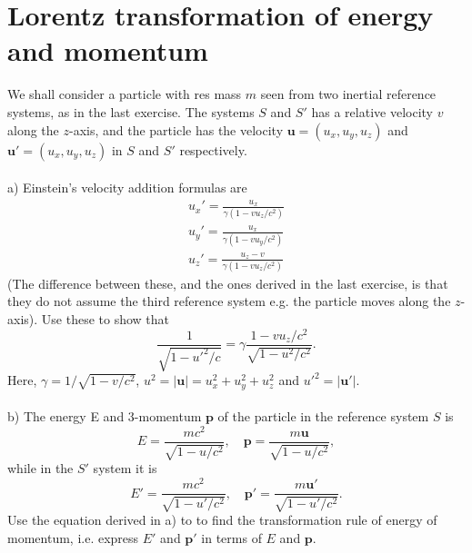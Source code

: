 \documentclass{article}
\begin{document}
    \section{Lorentz transformation of energy and momentum}
    We shall consider a particle with res mass $m$ seen from two inertial reference systems, as in the last exercise. The systems $S$ and $S'$ has a relative velocity $v$ along the $z$-axis, and the particle has the velocity $\mathbf{u} = (u_x, u_y, u_z)$ and $\mathbf{u'} = (u_x, u_y, u_z)$ in $S$ and $S'$ respectively. \\ \\
    a) Einstein's velocity addition formulas are
    \begin{align*}
        u_x' = \frac{u_x}{\gamma(1 - v u_z/c^2)} \\
        u_y' = \frac{u_x}{\gamma(1 - v u_y/c^2)} \\
        u_z' = \frac{u_z - v}{\gamma(1 - v u_z/c^2)}
    \end{align*}
    (The difference between these, and the ones derived in the last exercise, is that they do not assume the third reference system e.g. the particle moves along the $z$-axis). Use these to show that
    \begin{equation*}
        \frac{1}{\sqrt{1 - u'^2/c}} = \gamma \frac{1 - v u_z / c^2}{\sqrt{1 - u^2/c^2}}.
    \end{equation*}
    Here, $\gamma = 1 / \sqrt{1 - v/c^2}$, $u^2= |\mathbf{u}| = u_x^2 + u_y^2 + u_z^2$ and $u'^2= |\mathbf{u}'|$. \\ \\
    b) The energy E and 3-momentum $\mathbf{p}$ of the particle in the reference system $S$ is
    \begin{equation*}
        E = \frac{mc^2}{\sqrt{1 - u/c^2}}, \quad \mathbf{p} =\frac{m\mathbf{u}}{\sqrt{1 - u/c^2}},
    \end{equation*}
    while in the $S'$ system it is
    \begin{equation*}
        E' = \frac{mc^2}{\sqrt{1 - u'/c^2}}, \quad \mathbf{p'} =\frac{m\mathbf{u'}}{\sqrt{1 - u'/c^2}}.
    \end{equation*}
    Use the equation derived in a) to to find the transformation rule of energy of momentum, i.e. express $E'$ and $\mathbf{p}'$ in terms of $E$ and $\mathbf{p}$.
\end{document}
